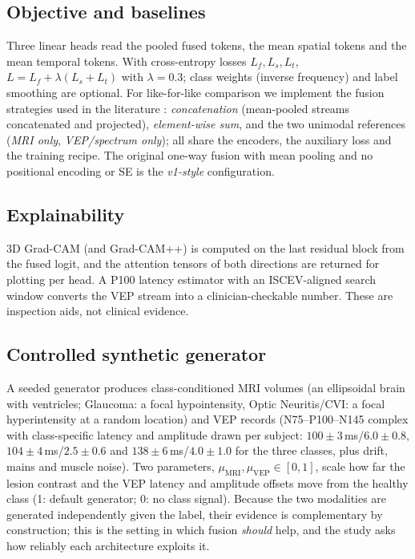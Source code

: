 \documentclass{ieeeaccessapprox}
\begin{document}
\subsection{Objective and baselines}
Three linear heads read the pooled fused tokens, the mean spatial tokens and the mean temporal tokens. With cross-entropy losses $L_f,L_s,L_t$, $L=L_f+\lambda(L_s+L_t)$ with $\lambda=0.3$; class weights (inverse frequency) and label smoothing are optional. For like-for-like comparison we implement the fusion strategies used in the literature \cite{zhou2024camf}: \emph{concatenation} (mean-pooled streams concatenated and projected), \emph{element-wise sum}, and the two unimodal references (\emph{MRI only}, \emph{VEP/spectrum only}); all share the encoders, the auxiliary loss and the training recipe. The original one-way fusion with mean pooling and no positional encoding or SE is the \emph{v1-style} configuration.

\subsection{Explainability}
3D Grad-CAM (and Grad-CAM++) is computed on the last residual block from the fused logit, and the attention tensors of both directions are returned for plotting per head. A P100 latency estimator with an ISCEV-aligned search window converts the VEP stream into a clinician-checkable number. These are inspection aids, not clinical evidence.

\subsection{Controlled synthetic generator}\label{sec:synth}
A seeded generator produces class-conditioned MRI volumes (an ellipsoidal brain with ventricles; Glaucoma: a focal hypointensity, Optic Neuritis/CVI: a focal hyperintensity at a random location) and VEP records (N75--P100--N145 complex with class-specific latency and amplitude drawn per subject: $100\pm3$\,ms/$6.0\pm0.8$, $104\pm4$\,ms/$2.5\pm0.6$ and $138\pm6$\,ms/$4.0\pm1.0$ for the three classes, plus drift, mains and muscle noise). Two parameters, $\mu_{\mathrm{MRI}},\mu_{\mathrm{VEP}}\in[0,1]$, scale how far the lesion contrast and the VEP latency and amplitude offsets move from the healthy class (1: default generator; 0: no class signal). Because the two modalities are generated independently given the label, their evidence is complementary by construction; this is the setting in which fusion \emph{should} help, and the study asks how reliably each architecture exploits it.
\end{document}
